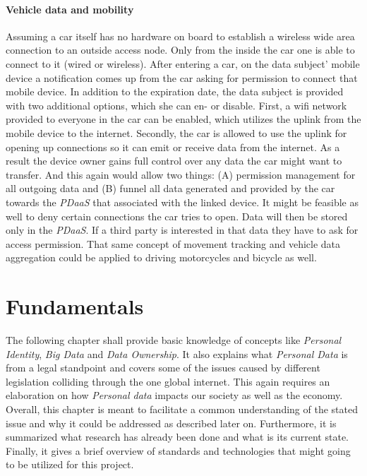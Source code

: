 \documentclass[12pt,english,a4paper,titlepage,cleardoublepage=empty,dottedtoc]{report}
\begin{document}
\subsubsection{Vehicle data and
mobility}\label{vehicle-data-and-mobility}

Assuming a car itself has no hardware on board to establish a wireless
wide area connection to an outside access node. Only from the inside the
car one is able to connect to it (wired or wireless). After entering a
car, on the data subject' mobile device a notification comes up from the
car asking for permission to connect that mobile device. In addition to
the expiration date, the data subject is provided with two additional
options, which she can en- or disable. First, a wifi network provided to
everyone in the car can be enabled, which utilizes the uplink from the
mobile device to the internet. Secondly, the car is allowed to use the
uplink for opening up connections so it can emit or receive data from
the internet. As a result the device owner gains full control over any
data the car might want to transfer. And this again would allow two
things: (A) permission management for all outgoing data and (B) funnel
all data generated and provided by the car towards the \emph{PDaaS} that
associated with the linked device. It might be feasible as well to deny
certain connections the car tries to open. Data will then be stored only
in the \emph{PDaaS}. If a third party is interested in that data they
have to ask for access permission. That same concept of movement
tracking and vehicle data aggregation could be applied to driving
motorcycles and bicycle as well.

\chapter{Fundamentals}\label{fundamentals}

The following chapter shall provide basic knowledge of concepts like
\emph{Personal Identity}, \emph{Big Data} and \emph{Data Ownership}. It
also explains what \emph{Personal Data} is from a legal standpoint and
covers some of the issues caused by different legislation colliding
through the one global internet. This again requires an elaboration on
how \emph{Personal data} impacts our society as well as the economy.
Overall, this chapter is meant to facilitate a common understanding of
the stated issue and why it could be addressed as described later on.
Furthermore, it is summarized what research has already been done and
what is its current state. Finally, it gives a brief overview of
standards and technologies that might going to be utilized for this
project.
\end{document}
